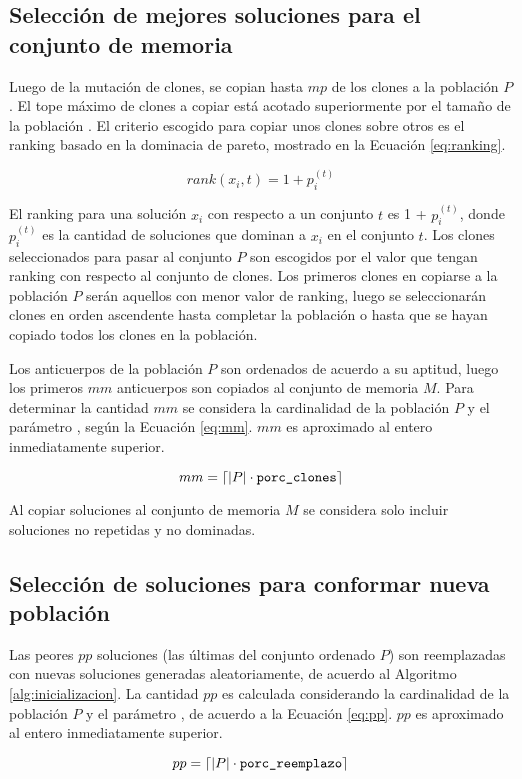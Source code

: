\subsection{Selección de mejores soluciones para el conjunto de memoria}

Luego de la mutación de clones, se copian hasta $mp$ de los clones a la población $P$. El tope máximo de clones a copiar está acotado superiormente por el tamaño de la población \popsize. El criterio escogido para copiar unos clones sobre otros es el ranking basado en la dominacia de pareto, mostrado en la Ecuación \eqref{eq:ranking}.

\begin{equation}
\label{eq:ranking}
rank(x_i,t) = 1+p_i^{(t)}
\end{equation}

El ranking para una solución $x_i$ con respecto a un conjunto $t$ es 1 + $p_i^{(t)}$, donde $p_i^{(t)}$ es la cantidad de soluciones que dominan a $x_{i}$ en el conjunto $t$. Los clones seleccionados para pasar al conjunto $P$ son escogidos por el valor que tengan ranking con respecto al conjunto de clones. Los primeros clones en copiarse a la población $P$ serán aquellos con menor valor de ranking, luego se seleccionarán clones en orden ascendente hasta completar la población \popsize{} o hasta que se hayan copiado todos los clones en la población.

Los anticuerpos de la población $P$ son ordenados de acuerdo a su aptitud, luego los primeros $mm$ anticuerpos son copiados al conjunto de memoria $M$. Para determinar la cantidad $mm$ se considera la cardinalidad de la población $P$ y el parámetro \pclones{}, según la Ecuación \eqref{eq:mm}. $mm$ es aproximado al entero inmediatamente superior.

\begin{equation}
\label{eq:mm}
mm = \ceil*{|P| \cdot \pclones}
\end{equation}

Al copiar soluciones al conjunto de memoria $M$ se considera solo incluir soluciones no repetidas y no dominadas.

\subsection{Selección de soluciones para conformar nueva población}

Las peores $pp$ soluciones (las últimas del conjunto ordenado $P$) son reemplazadas con nuevas soluciones generadas aleatoriamente, de acuerdo al Algoritmo \ref{alg:inicializacion}. La cantidad $pp$ es calculada considerando la cardinalidad de la población $P$ y el parámetro \preemplazo{}, de acuerdo a la Ecuación \ref{eq:pp}. $pp$ es aproximado al entero inmediatamente superior.

\begin{equation}
\label{eq:pp}
pp = \ceil*{|P| \cdot \preemplazo}
\end{equation}

